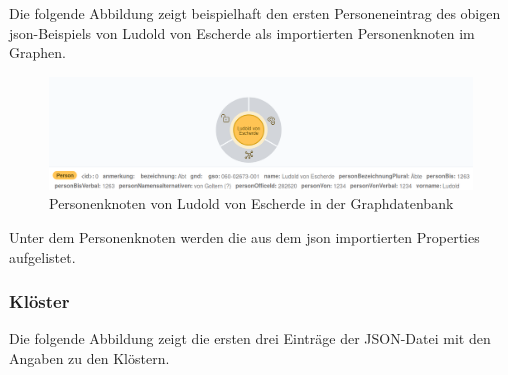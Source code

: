 \documentclass[12pt,ngerman,]{article}
\begin{document}
Die folgende Abbildung zeigt beispielhaft den ersten Personeneintrag des
obigen json-Beispiels von Ludold von Escherde als importierten
Personenknoten im Graphen.

\begin{figure}
\centering
\includegraphics{Bilder/Germania-Sacra-Personenknoten-mit-Properties.png}
\caption{Personenknoten von Ludold von Escherde in der Graphdatenbank}
\end{figure}

Unter dem Personenknoten werden die aus dem json importierten Properties
aufgelistet.

\subsubsection{Klöster}\label{kluxf6ster}

Die folgende Abbildung zeigt die ersten drei Einträge der JSON-Datei mit
den Angaben zu den Klöstern.
\end{document}
